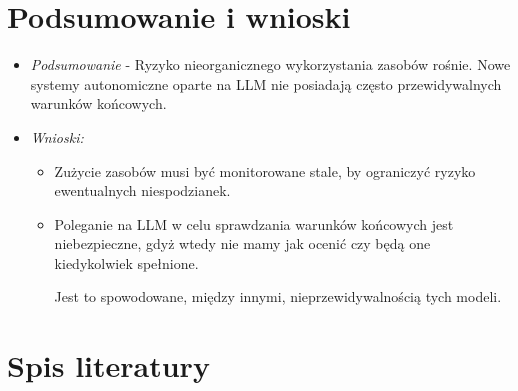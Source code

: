 \documentclass[12pt,aspectratio=169]{beamer}
\begin{document}
\section{Podsumowanie i wnioski}
\begin{frame}
\begin{itemize}
\item \textit{Podsumowanie} - Ryzyko nieorganicznego wykorzystania zasobów
  rośnie. Nowe systemy autonomiczne oparte na LLM nie posiadają często
    przewidywalnych warunków końcowych.
\item \textit{Wnioski:}
  \begin{itemize}
      \item Zużycie zasobów musi być monitorowane stale, by ograniczyć ryzyko
        ewentualnych niespodzianek.
      \item Poleganie na LLM w celu sprawdzania warunków końcowych jest
        niebezpieczne, gdyż wtedy nie mamy jak ocenić czy będą one kiedykolwiek
        spełnione. 

        Jest to spowodowane, między innymi, nieprzewidywalnością tych modeli.
  \end{itemize}
\end{itemize}

\end{frame}

\section{Spis literatury}

\begin{frame}

\printbibliography[heading=none] 

\end{frame}
\end{document}
